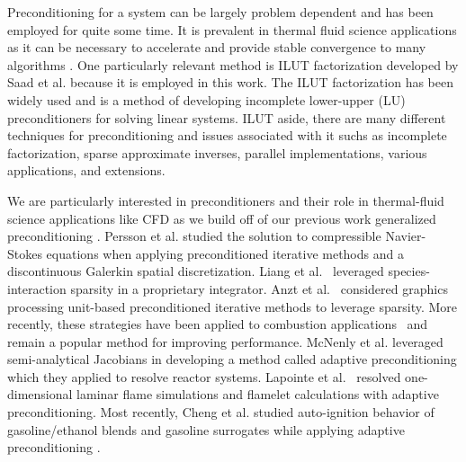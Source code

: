 \documentclass{article}
\begin{document}
Preconditioning for a system can be largely problem dependent and has been employed for quite some time\cite{bramble1988preconditioning, trefethen1997numerical, chen2005matrix}.
It is prevalent in thermal fluid science applications as it can be necessary to accelerate and provide stable convergence to many algorithms \cite{turkel1999preconditioning}.
One particularly relevant method is ILUT factorization developed by Saad et al. because it is employed in this work\cite{saad_ilut_1994}.
The ILUT factorization has been widely used and is a method of developing incomplete lower-upper (LU) preconditioners for solving linear systems\cite{saad_ilut_1994}.
ILUT aside, there are many different techniques for preconditioning and issues associated with it suchs as incomplete factorization, sparse approximate inverses, parallel implementations, various applications, and extensions\cite{benzi2002preconditioning, pearson2020preconditioners}.

We are particularly interested in preconditioners and their role in thermal-fluid science applications like CFD as we build off of our previous work generalized preconditioning \cite{walker2022generalized}.
Persson et al. studied the solution to compressible Navier-Stokes equations when applying preconditioned iterative methods and a discontinuous Galerkin spatial discretization\cite{persson_newton-gmres_2008}.
Liang et al.~\cite{liang_towards_2009} leveraged species-interaction sparsity in a proprietary integrator.
Anzt et al.~\cite{anzt_preconditioned_2017} considered graphics processing unit-based preconditioned iterative methods to leverage sparsity.
More recently, these strategies have been applied to combustion applications~\cite{marzouk_embedding_2012} and remain a popular method for improving performance.
McNenly et al. leveraged semi-analytical Jacobians in developing a method called adaptive preconditioning which they applied to resolve reactor systems\cite{mcnenly_faster_2015}.
Lapointe et al.~\cite{lapointe_sparse_2019, lapointe_computationally-efficient_2020} resolved one-dimensional laminar flame simulations and flamelet calculations with adaptive preconditioning.
Most recently, Cheng et al. studied auto-ignition behavior of gasoline/ethanol blends and gasoline surrogates while applying adaptive preconditioning \cite{cheng2020autoignition, cheng2021autoignition}.
\end{document}
